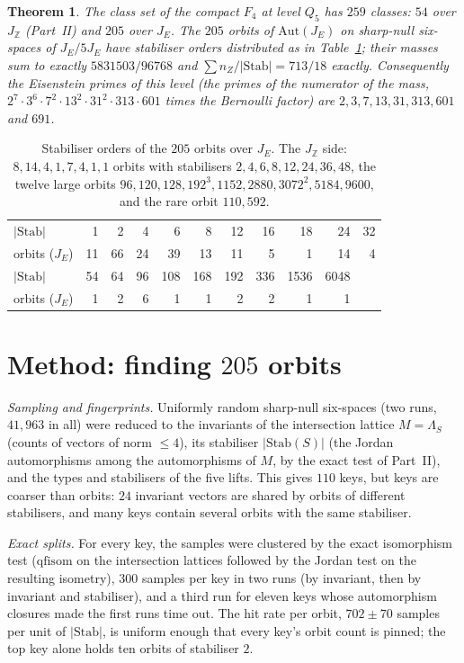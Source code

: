 \documentclass[11pt]{article}
\newtheorem{theorem}{Theorem}[section]\newtheorem{lemma}[theorem]{Lemma}\newtheorem{proposition}[theorem]{Proposition}
\theoremstyle{definition}\newtheorem{computation}[theorem]{Computation}\newtheorem{remark}[theorem]{Remark}\newtheorem{prediction}[theorem]{Prediction}
\newcommand{\Z}{\mathbb Z}\newcommand{\Q}{\mathbb Q}\newcommand{\F}{\mathbb F}\newcommand{\Ff}{F_4}\newcommand{\Aut}{\mathrm{Aut}}\newcommand{\Stab}{\mathrm{Stab}}
\begin{document}
\begin{theorem}\label{thm:classset}
The class set of the compact $\Ff$ at level $Q_5$ has $259$ classes: $54$ over $J_\Z$ (Part~II) and $205$ over $J_E$. The $205$ orbits of $\Aut(J_E)$ on sharp-null six-spaces of $J_E/5J_E$ have stabiliser orders distributed as in Table~\ref{tab:stabs}; their masses sum to exactly $5831503/96768$ and $\sum n_Z/|\Stab|=713/18$ exactly. Consequently the Eisenstein primes of this level (the primes of the numerator of the mass, $2^7\cdot3^6\cdot7^2\cdot13^2\cdot31^2\cdot313\cdot601$ times the Bernoulli factor) are $2,3,7,13,31,313,601$ and $691$.
\end{theorem}

\begin{table}[h]\centering\small
\begin{tabular}{l*{10}{r}}\toprule
$|\Stab|$ & 1&2&4&6&8&12&16&18&24&32\\ orbits ($J_E$) & 11&66&24&39&13&11&5&1&14&4\\\midrule
$|\Stab|$ & 54&64&96&108&168&192&336&1536&6048& \\ orbits ($J_E$) & 1&2&6&1&1&2&2&1&1& \\\bottomrule
\end{tabular}
\caption{Stabiliser orders of the $205$ orbits over $J_E$. The $J_\Z$ side: $8,14,4,1,7,4,1,1$ orbits with stabilisers $2,4,6,8,12,24,36,48$, the twelve large orbits $96,120,128,192^3,1152,2880,3072^2,5184,9600$, and the rare orbit $110{,}592$.}\label{tab:stabs}
\end{table}

\section{Method: finding $205$ orbits}
\emph{Sampling and fingerprints.} Uniformly random sharp-null six-spaces (two runs, $41{,}963$ in all) were reduced to the invariants of the intersection lattice $M=\Lambda_S$ (counts of vectors of norm $\le4$), its stabiliser $|\Stab(S)|$ (the Jordan automorphisms among the automorphisms of $M$, by the exact test of Part~II), and the types and stabilisers of the five lifts. This gives $110$ keys, but keys are coarser than orbits: $24$ invariant vectors are shared by orbits of different stabilisers, and many keys contain several orbits with the same stabiliser.

\emph{Exact splits.} For every key, the samples were clustered by the exact isomorphism test ($\mathrm{qfisom}$ on the intersection lattices followed by the Jordan test on the resulting isometry), $300$ samples per key in two runs (by invariant, then by invariant and stabiliser), and a third run for eleven keys whose automorphism closures made the first runs time out. The hit rate per orbit, $702\pm70$ samples per unit of $|\Stab|$, is uniform enough that every key's orbit count is pinned; the top key alone holds ten orbits of stabiliser $2$.
\end{document}
